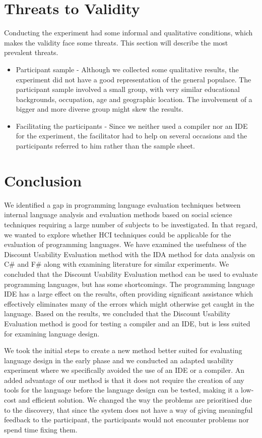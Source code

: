 \documentclass[10pt]{sigplanconf}
\begin{document}
\section{Threats to Validity}
Conducting the experiment had some informal and qualitative conditions, which makes the validity face some threats. This section will describe the most prevalent threats.
\begin{itemize}
\item Participant sample - Although we collected some qualitative results, the experiment did not have a good representation of the general populace. The participant sample involved a small group, with very similar educational backgrounds, occupation, age and geographic location. The involvement of a bigger and more diverse group might skew the results.
\item Facilitating the participants - Since we neither used a compiler nor an IDE for the experiment, the facilitator had to help on several occasions and the participants referred to him rather than the sample sheet.
\end{itemize}

\section{Conclusion}
We identified a gap in programming language evaluation techniques between internal language analysis and evaluation methods based on social science techniques requiring a large number of subjects to be investigated. In that regard, we wanted to explore whether HCI techniques could be applicable for the evaluation of programming languages.
We have examined the usefulness of the Discount Usability Evaluation method with the IDA method for data analysis on C\# and F\# along with examining literature for similar experiments. We concluded that the Discount Usability Evaluation method can be used to evaluate programming languages, but has some shortcomings.
The programming language IDE has a large effect on the results, often providing significant assistance which effectively eliminates many of the errors which might otherwise get caught in the language.
Based on the results, we concluded that the Discount Usability Evaluation method is good for testing a compiler and an IDE, but is less suited for examining language design.

We took the initial steps to create a new method better suited for evaluating language design in the early phase and we conducted an adapted usability experiment where we specifically avoided the use of an IDE or a compiler.
An added advantage of our method is that it does not require the creation of any tools for the language before the language design can be tested, making it a low-cost and efficient solution.
We changed the way the problems are prioritised due to the discovery, that since the system does not have a way of giving meaningful feedback to the participant, the participants would not encounter problems nor spend time fixing them.
\end{document}
